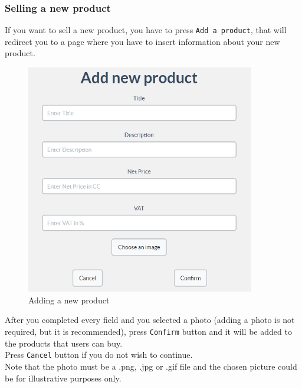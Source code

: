 		\subsubsection{Selling a new product}
		If you want to sell a new product, you have to press \texttt{Add a
		product}, that will redirect you to a page where you have to insert
		information about your new product.
		\begin{figure}[H]
			\includegraphics[width=10cm]{res/images/add_new_product.png}
			\centering
			\caption{Adding a new product}
		\end{figure}
		\noindent After you completed every field and you selected a photo 
		(adding a photo is not required, but it is recommended),
		press \texttt{Confirm} button and 
		it will be added to the products that users can buy.
		\\Press \texttt{Cancel} button if you do not wish to continue.
		\\Note that the photo must be a .png, .jpg or .gif file and the 
		 chosen picture could be for illustrative purposes only.
		 
